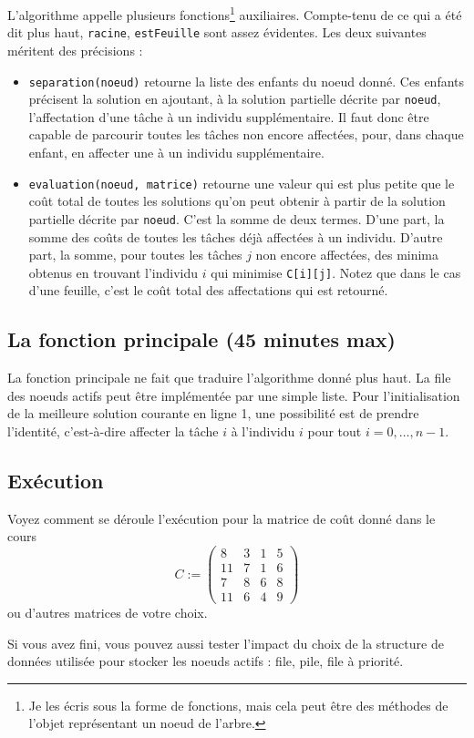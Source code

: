 \documentclass[a4paper,francais]{article}
\theoremstyle{definition}
\begin{document}
L'algorithme appelle plusieurs fonctions\footnote{Je les écris sous la forme de fonctions, mais cela peut être des méthodes de l'objet représentant un noeud de l'arbre.} auxiliaires. Compte-tenu de ce qui a été dit plus haut, \verb+racine+, \verb+estFeuille+ sont assez évidentes. Les deux suivantes méritent des précisions :
\begin{itemize}
\item \verb+separation(noeud)+ retourne la liste des enfants du noeud donné. Ces enfants précisent la solution en ajoutant, à la solution partielle décrite par \verb+noeud+, l'affectation d'une tâche à un individu supplémentaire. Il faut donc être capable de parcourir toutes les tâches non encore affectées, pour, dans chaque enfant, en affecter une à un individu supplémentaire. 
\item \verb+evaluation(noeud, matrice)+ retourne une valeur qui est plus petite que le coût total de toutes les solutions qu'on peut obtenir à partir de la solution partielle décrite par \verb+noeud+. C'est la somme de deux termes. D'une part, la somme des coûts de toutes les tâches déjà affectées à un individu. D'autre part, la somme, pour toutes les tâches $j$ non encore affectées, des minima obtenus en trouvant l'individu $i$ qui minimise \verb+C[i][j]+. Notez que dans le cas d'une feuille, c'est le coût total des affectations qui est retourné.   
\end{itemize}

\subsection{La fonction principale (45 minutes max)}

La fonction principale ne fait que traduire l'algorithme donné plus haut.
La file des noeuds actifs peut être implémentée par une simple liste.
Pour l'initialisation de la meilleure solution courante en ligne 1,
une possibilité est de prendre l'identité,
c'est-à-dire affecter la tâche $i$ à l'individu $i$
pour tout $i=0,\dots,n-1$. 

\subsection{Exécution}

Voyez comment se déroule l'exécution pour la matrice de coût donné dans le cours
    \[ C := \left(
    \begin{array}{cccc}
      8 & 3 & 1 & 5 \\
      11 & 7 & 1 & 6 \\
      7 & 8 & 6 & 8 \\
      11 & 6 & 4 & 9 
    \end{array}
    \right) \]
ou d'autres matrices de votre choix.

Si vous avez fini, vous pouvez aussi tester l'impact du choix de la structure de données utilisée
pour stocker les noeuds actifs : file, pile, file à priorité.   
\end{document}

